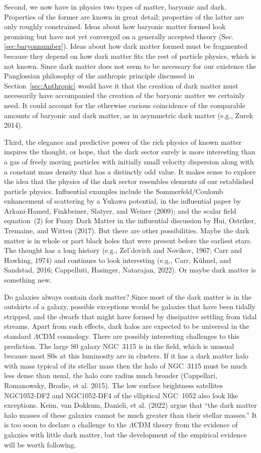 \documentclass[fleqn,12pt]{article}
\begin{document}
Second, we now have in physics two types of matter, baryonic and dark. Properties of the former are known in great detail; properties of the latter are only roughly constrained. Ideas about how baryonic matter formed look promising but have not yet converged on a generally accepted theory (Sec.\ref{sec:baryonnumber}). Ideas about how dark matter formed must be fragmented because they depend on how dark matter fits the rest of particle physics, which is not known. Since dark matter does not seem to be necessary for our existence the Panglossian philosophy of the anthropic principle discussed in Section~\ref{sec:Anthropic} would have it that the creation of dark matter must necessarily have accompanied the creation of the baryonic matter we certainly need. It could account for the otherwise curious coincidence of the comparable amounts of baryonic and dark matter, as in asymmetric dark matter (e.g., Zurek 2014).

Third, the elegance and predictive power of the rich physics of known matter inspires the thought, or hope, that the dark sector surely is more interesting than a gas of freely moving particles with initially small velocity dispersion along with a constant mass density that has a distinctly odd value. It makes sense to explore the idea that the physics of the dark sector resembles elements of our established particle physics. Influential examples include the Sommerfeld/Coulomb enhancement of scattering by a Yukawa potential, in the influential paper by Arkani-Hamed, Finkbeiner, Slatyer, and Weiner (2009); and the scalar field equation~(2) for Fuzzy Dark Matter in the influential discussion by Hui, Ostriker, Tremaine, and Witten (2017). But there are other possibilities. Maybe the dark matter is in whole or part black holes that were present before the earliest stars. The thought has a long history (e.g., Zel'dovich and Novikov, 1967; Carr and Hawking, 1974) and continues to look interesting (e.g., Carr, K{\"u}hnel, and Sandstad, 2016; Cappelluti, Hasinger, Natarajan, 2022). Or maybe dark matter is something new. 

Do galaxies always contain dark matter? Since most of the dark matter is in the outskirts of a galaxy, possible exceptions would be galaxies that have been tidally stripped, and the dwarfs that might have formed by dissipative settling from tidal streams. Apart from such effects, dark halos are expected to be universal in the standard $\Lambda$CDM cosmology. There are possibly interesting challenges to this prediction. The large S0 galaxy NGC~3115 is in the field, which is unusual because most S0s at this luminosity are in clusters. If it has a dark matter halo with mass typical of its stellar mass then the halo of NGC~3115 must be much less dense than usual, the halo core radius much broader (Cappellari, Romanowsky, Brodie, et al. 2015). The low surface brightness satellites NGC1052-DF2 and NGC1052-DF4 of the elliptical NGC~1052 also look like exceptions. Keim, van Dokkum, Danieli, et al. (2022) argue that ``the dark matter halo masses of these galaxies cannot be much greater than their stellar masses.'' It is too soon to declare a challenge to the $\Lambda$CDM theory from the evidence of galaxies with little dark matter, but the development of the empirical evidence will be worth following. 
\end{document}
